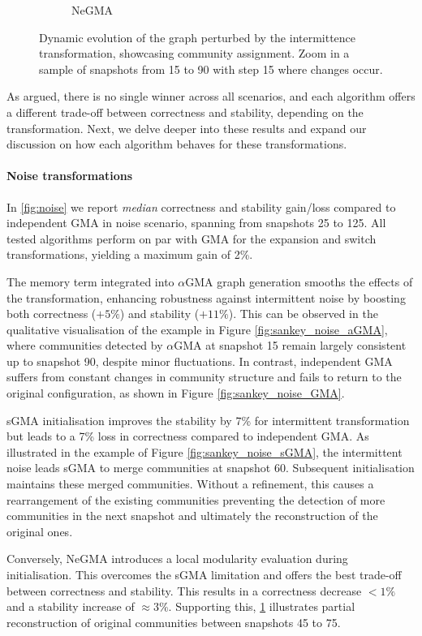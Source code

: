 \documentclass[letterpaper]{article}
\begin{document}
\begin{figure}[!t]
\begin{subfigure}[b]{.24\linewidth}
        \caption{NeGMA}
        \label{fig:sankey_noise_neGMA}
    \end{subfigure}
    \caption{Dynamic evolution of the graph perturbed by the intermittence transformation, showcasing community assignment. Zoom in a sample of snapshots from 15 to 90 with step 15 where changes occur.}
    \label{fig:sankey_intermittence}
\end{figure} 
As argued, there is no single winner across all scenarios, and each algorithm offers a different trade-off between correctness and stability, depending on the transformation. Next, we delve deeper into these results and expand our discussion on how each algorithm behaves for these transformations.

\paragraph*{Noise transformations}
In \cref{fig:noise} we report {\it median} correctness and stability gain/loss compared to independent GMA in noise scenario, spanning from snapshots 25 to 125.   
All tested algorithms perform on par with GMA for the expansion and switch transformations, yielding a maximum gain of 2\%.

The memory term integrated into $\alpha$GMA graph generation smooths the effects of the transformation, enhancing robustness against intermittent noise by boosting both correctness ($+5\%$) and stability ($+11\%$).
This can be observed in the qualitative visualisation of the example in Figure \ref{fig:sankey_noise_aGMA}, where communities detected by $\alpha$GMA at snapshot 15 remain largely consistent up to snapshot 90, despite minor fluctuations. In contrast, independent GMA suffers from constant changes in community structure and fails to return to the original configuration, as shown in Figure \ref{fig:sankey_noise_GMA}.

sGMA initialisation improves the stability by 7\% for intermittent transformation but leads to a 7\% loss in correctness compared to independent GMA. As illustrated in the example of Figure \ref{fig:sankey_noise_sGMA}, the intermittent noise leads sGMA to merge communities at snapshot 60. Subsequent initialisation maintains these merged communities. Without a refinement, this causes a rearrangement of the existing communities preventing the detection of more communities in the next snapshot and ultimately the reconstruction of the original ones.

Conversely, NeGMA introduces a local modularity evaluation during initialisation. This overcomes the sGMA limitation and offers the best trade-off between correctness and stability. This results in a correctness decrease $<1\%$ and a stability increase of $\approx 3\%$.  Supporting this, \cref{fig:sankey_noise_neGMA} illustrates partial reconstruction of original communities between snapshots 45 to 75.
\end{document}
